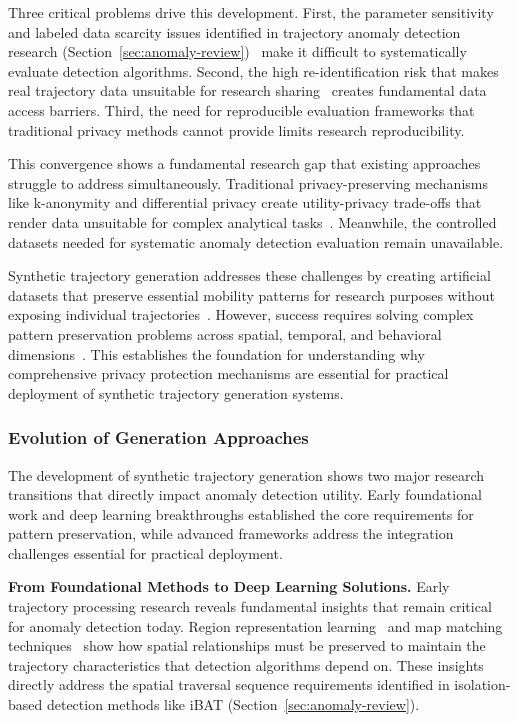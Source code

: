 \documentclass[runningheads]{llncs}
\begin{document}
Three critical problems drive this development. First, the parameter sensitivity and labeled data scarcity issues identified in trajectory anomaly detection research (Section~\ref{sec:anomaly-review})~\cite{zhangIBATDetectingAnomalous2011} make it difficult to systematically evaluate detection algorithms. Second, the high re-identification risk that makes real trajectory data unsuitable for research sharing~\cite{raoCATSConditionalAdversarial2023} creates fundamental data access barriers. Third, the need for reproducible evaluation frameworks that traditional privacy methods cannot provide limits research reproducibility.

This convergence shows a fundamental research gap that existing approaches struggle to address simultaneously. Traditional privacy-preserving mechanisms like k-anonymity and differential privacy create utility-privacy trade-offs that render data unsuitable for complex analytical tasks~\cite{jordonPATEGANGeneratingSynthetic2019}. Meanwhile, the controlled datasets needed for systematic anomaly detection evaluation remain unavailable.

Synthetic trajectory generation addresses these challenges by creating artificial datasets that preserve essential mobility patterns for research purposes without exposing individual trajectories~\cite{caoGeneratingMobilityTrajectories2021}. However, success requires solving complex pattern preservation problems across spatial, temporal, and behavioral dimensions~\cite{kongMobilityTrajectoryGeneration2023,merhiSyntheticTrajectoryGeneration2024}. This establishes the foundation for understanding why comprehensive privacy protection mechanisms are essential for practical deployment of synthetic trajectory generation systems.

\subsubsection{Evolution of Generation Approaches}

The development of synthetic trajectory generation shows two major research transitions that directly impact anomaly detection utility. Early foundational work and deep learning breakthroughs established the core requirements for pattern preservation, while advanced frameworks address the integration challenges essential for practical deployment.

\textbf{From Foundational Methods to Deep Learning Solutions.} Early trajectory processing research reveals fundamental insights that remain critical for anomaly detection today. Region representation learning~\cite{wangRegionRepresentationLearning2017} and map matching techniques~\cite{newsonHiddenMarkovMap2009} show how spatial relationships must be preserved to maintain the trajectory characteristics that detection algorithms depend on. These insights directly address the spatial traversal sequence requirements identified in isolation-based detection methods like iBAT (Section~\ref{sec:anomaly-review}).
\end{document}
